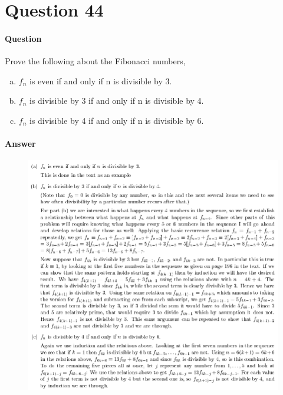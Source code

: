 \documentclass[UTF8]{article}
\begin{document}
    \section{Question 44}
    \paragraph{Question}
    Prove the following about the Fibonacci numbers,
    \begin{enumerate}[(a)]
        \item $ f_{n} $ is even if and only if n is divisible by 3.
        \item $ f_{n} $ is divisible by 3 if and only if n is divisible by 4.
        \item $ f_{n} $ is divisible by 4 if and only if n is divisible by 6.
    \end{enumerate}
    \paragraph{Answer}
    \begin{center}
        \begin{figure}[ht]
            \centering
            \includegraphics[scale=0.6]{img/t44_a.png}
            \end{figure}
    \end{center}
    
\end{document}

